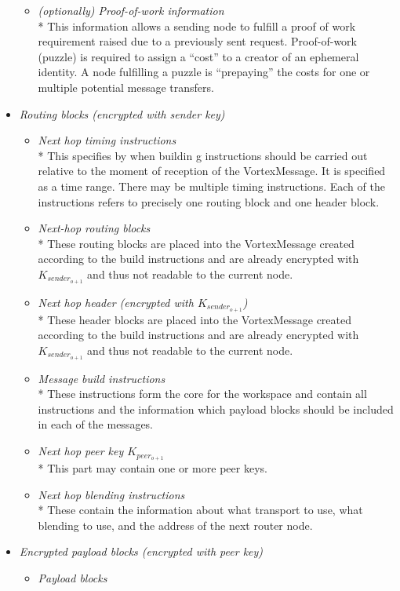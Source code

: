 \documentclass[10pt,journal,compsoc,twocolumn,twoside]{IEEEtran}
\begin{document}
\begin{itemize}
\begin{itemize}
		\item \emph{(optionally) Proof-of-work information}\\*
		This information allows a sending node to fulfill a proof of work requirement raised due to a previously sent request. Proof-of-work (puzzle) is required to assign a ``cost'' to a creator of an ephemeral identity. A node fulfilling a puzzle is ``prepaying'' the costs for one or multiple potential message transfers. 
	\end{itemize}
	\item \emph{Routing blocks (encrypted with sender key)}
	\begin{itemize}
		\item \emph{Next hop timing instructions}\\*
		This specifies by when buildin g instructions should be carried out relative to the moment of reception of the VortexMessage. It is specified as a time range. There may be multiple timing instructions. Each of the instructions refers to precisely one routing block and one header block.
		\item \emph{Next-hop routing blocks}\\*
		These routing blocks are placed into the VortexMessage created according to the build instructions and are already encrypted with $K_{sender_{o+1}}$ and thus not readable to the current node.
		\item \emph{Next hop header (encrypted with $K_{sender_{o+1}}$)}\\*
		These header blocks are placed into the VortexMessage created according to the build instructions and are already encrypted with $K_{sender_{o+1}}$ and thus not readable to the current node.
		\item \emph{Message build instructions}\\*
		These instructions form the core for the workspace and contain all instructions and the information which payload blocks should be included in each of the messages.
		\item \emph{Next hop peer key $K_{peer_{o+1}}$}\\*
		This part may contain one or more peer keys.
		\item \emph{Next hop blending instructions}\\*
		These contain the information about what transport to use, what blending to use, and the address of the next router node.
	\end{itemize}
	\item \emph{Encrypted payload blocks (encrypted with peer key)}
	\begin{itemize}
		\item \emph{Payload blocks}
	\end{itemize}
\end{itemize}
\end{document}
